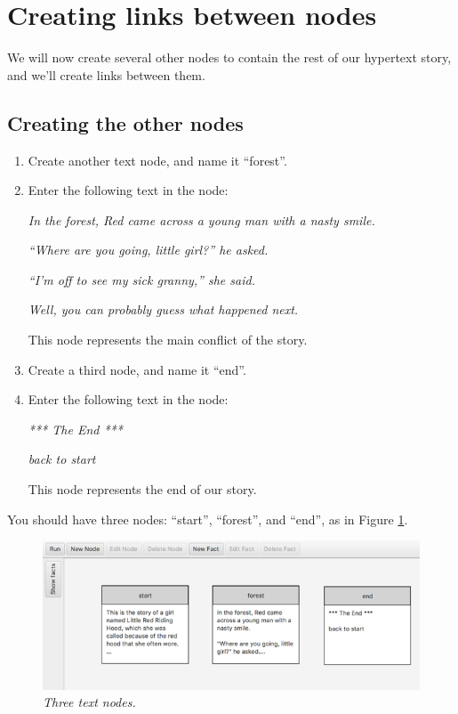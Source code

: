 \documentclass{article}
\begin{document}
\section{Creating links between nodes}

We will now create several other nodes to contain the rest of our hypertext story, and we'll create links between them.

\subsection{Creating the other nodes}

\begin{enumerate}
  \item Create another text node, and name it ``forest''.
  \item Enter the following text in the node:

\textit{In the forest, Red came across a young man with a nasty smile.}

\textit{``Where are you going, little girl?'' he asked.}

\textit{``I'm off to see my sick granny,'' she said.}

\textit{Well, you can probably guess what happened next.}

This node represents the main conflict of the story.

\item Create a third node, and name it ``end''.
\item Enter the following text in the node:

\textit{*** The End ***}

\textit{back to start}

This node represents the end of our story.
\end{enumerate}

You should have three nodes: ``start'', ``forest'', and ``end'', as in
Figure \ref{fig:tut1:three_nodes}.
 
\begin{figure}[ht]
  \centering
  \includegraphics[width=12cm]{images/hypedyn-tutorial-1-figure-6}
  \caption{\textit{Three text nodes.}}
  \label{fig:tut1:three_nodes}
\end{figure} 
\end{document}

